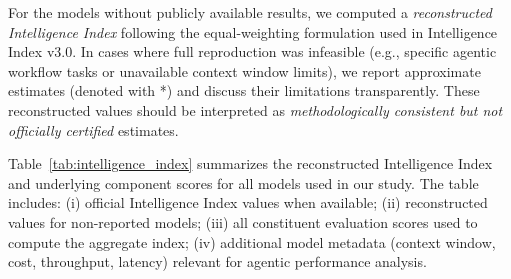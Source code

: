 For the models without publicly available results, we computed a \textit{reconstructed Intelligence Index} following the equal-weighting formulation used in Intelligence Index v3.0. In cases where full reproduction was infeasible (e.g., specific agentic workflow tasks or unavailable context window limits), we report approximate estimates (denoted with *) and discuss their limitations transparently. These reconstructed values should be interpreted as \emph{methodologically consistent but not officially certified} estimates.


Table~\ref{tab:intelligence_index} summarizes the reconstructed Intelligence Index and underlying component scores for all models used in our study. The table includes:  
(i) official Intelligence Index values when available;  
(ii) reconstructed values for non-reported models;  
(iii) all constituent evaluation scores used to compute the aggregate index;  
(iv) additional model metadata (context window, cost, throughput, latency) relevant for agentic performance analysis.



